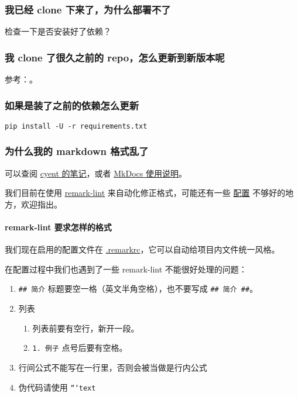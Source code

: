 \subsubsection{我已经 clone 下来了，为什么部署不了}

检查一下是否安装好了依赖？

\subsubsection{我 clone 了很久之前的 repo，怎么更新到新版本呢}

参考：\href{https://help.github.com/articles/syncing-a-fork/}{}。

\subsubsection{如果是装了之前的依赖怎么更新}

\begin{verbatim}
pip install -U -r requirements.txt
\end{verbatim}

\subsubsection{为什么我的 markdown 格式乱了}

可以查阅 \href{https://cyent.github.io/markdown-with-mkdocs-material/}{cyent 的笔记}，或者 \href{https://github.com/ctf-wiki/ctf-wiki/wiki/Mkdocs-%E4%BD%BF%E7%94%A8%E8%AF%B4%E6%98%8E}{MkDocs 使用说明}。

我们目前在使用 \href{https://github.com/remarkjs/remark-lint}{remark-lint} 来自动化修正格式，可能还有一些 \href{https://github.com/24OI/OI-wiki/blob/master/.remarkrc}{配置} 不够好的地方，欢迎指出。

\paragraph{remark-lint 要求怎样的格式}

我们现在启用的配置文件在 \href{https://github.com/24OI/OI-wiki/blob/master/.remarkrc}{.remarkrc}，它可以自动给项目内文件统一风格。

在配置过程中我们也遇到了一些 remark-lint 不能很好处理的问题：

\begin{enumerate}
\item \texttt{## 简介} 标题要空一格（英文半角空格），也不要写成 \texttt{## 简介 ##}。
\item 列表
\begin{enumerate}
\item 列表前要有空行，新开一段。
\item \texttt{1. 例子} 点号后要有空格。
\end{enumerate}
\item 行间公式不能写在一行里，否则会被当做是行内公式
\item 伪代码请使用 \texttt{```text}
\end{enumerate}


